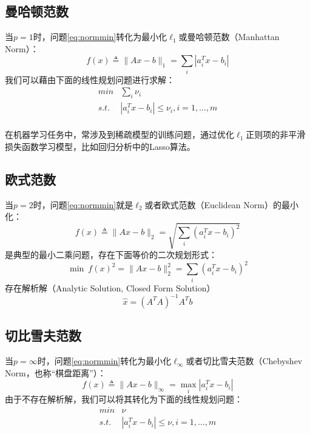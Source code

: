 \subsection{曼哈顿范数}
当$p=1$时，问题\eqref{eq:normmin}转化为最小化$\ell_1$或曼哈顿范数（Manhattan Norm）：
\[
    f(x) \triangleq \|Ax - b\|_1 = \sum\limits_i |a_i^T x - b_i|
\]
我们可以藉由下面的线性规划问题进行求解：
\[
    \begin{array}{ll}
      \textit{min} & \sum\limits_i \nu_i \\
      \textit{s.t.} & |a_i^T x - b_i|\le \nu_i, i = 1,\ldots,m \\
    \end{array}
\]

在机器学习任务中，常涉及到稀疏模型的训练问题，通过优化$\ell_1$正则项的非平滑损失函数学习模型，比如回归分析中的Lasso算法。

\subsection{欧式范数}
当$p=2$时，问题\eqref{eq:normmin}就是$\ell_2$或者欧式范数（Euclidean Norm）的最小化：
\[
    f(x) \triangleq \|Ax - b\|_2 = \sqrt{\sum\limits_i (a_i^T x - b_i)^2}
\]
是典型的最小二乘问题，存在下面等价的二次规划形式：
\[
    \min~f(x)^2 = \|Ax - b\|_2^2 = \sum\limits_i (a_i^T x - b_i)^2
\]
存在解析解（Analytic Solution, Closed Form Solution）
\[
    \hat x = (A^T A)^{-1}A^T b
\]

\subsection{切比雪夫范数}
当$p = \infty$时，问题\eqref{eq:normmin}转化为最小化$\ell_{\infty}$或者切比雪夫范数（Chebyshev Norm，也称“棋盘距离”）：
\[
    f(x) \triangleq \|Ax - b\|_{\infty} = \max\limits_i |a_i^T x - b_i|
\]
由于不存在解析解，我们可以将其转化为下面的线性规划问题：
\[
    \begin{array}{ll}
      \textit{min} & \nu \\
      \textit{s.t.} & |a_i^T x - b_i|\le \nu, i = 1,\ldots,m \\
    \end{array}
\]

